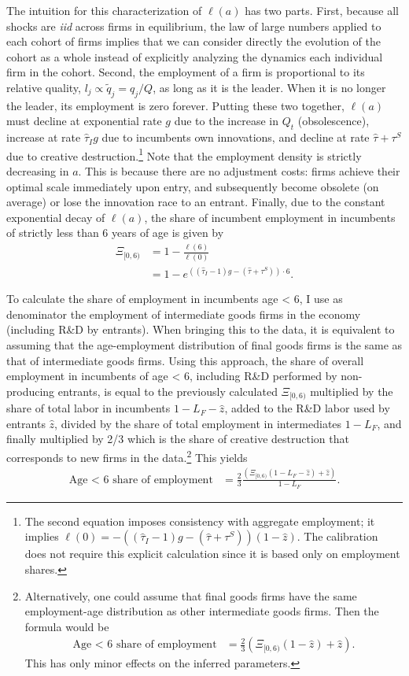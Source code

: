 \documentclass[ecta,nameyear,draft]{econsocart}
\theoremstyle{plain}
\theoremstyle{remark}
\begin{document}
\begin{appendix}
The intuition for this characterization of $\ell(a)$ has two parts. First, because all shocks are \textit{iid} across firms in equilibrium, the law of large numbers applied to each cohort of firms implies that we can consider directly the evolution of the cohort as a whole instead of explicitly analyzing the dynamics each individual firm in the cohort.  Second, the employment of a firm is proportional to its relative quality, $l_j \propto \tilde{q}_j = q_j / Q$, as long as it is the leader. When it is no longer the leader, its employment is zero forever. Putting these two together, $\ell(a)$ must decline at exponential rate $g$ due to the increase in $Q_t$ (obsolescence), increase at rate $\hat{\tau}_I g$ due to incumbents own innovations, and decline at rate $\hat{\tau} + \tau^S$ due to creative destruction.\footnote{The second equation imposes consistency with aggregate employment; it implies $\ell(0) = -((\hat{\tau}_I -1)g - (\hat{\tau} + \tau^S))(1-\hat{z})$. The calibration does not require this explicit calculation since it is based only on employment shares.} Note that the employment density is strictly decreasing in $a$. This is because there are no adjustment costs: firms achieve their optimal scale immediately upon entry, and subsequently become obsolete (on average) or lose the innovation race to an entrant. Finally, due to the constant exponential decay of $\ell(a)$, the share of incumbent employment in incumbents of strictly less than 6 years of age is given by 
\begin{align*}
	\Xi_{[0,6)} &=  1 - \frac{\ell(6)}{\ell(0)} \\
	&= 1 - e^{((\hat{\tau}_I -1)g - (\hat{\tau} + \tau^S))\cdot 6} .
\end{align*}  


To calculate the share of employment in incumbents age < 6, I use as denominator the employment of intermediate goods firms in the economy (including R\&D by entrants). When bringing this to the data, it is equivalent to assuming that the age-employment distribution of final goods firms is the same as that of intermediate goods firms. Using this approach, the share of overall employment in incumbents of age < 6, including R\&D performed by non-producing entrants, is equal to the previously calculated $\Xi_{[0,6)}$ multiplied by the share of total labor in incumbents $1 - L_F - \hat{z}$, added to the R\&D labor used by entrants $\hat{z}$, divided by the share of total employment in intermediates $1 - L_F$, and finally multiplied by 2/3 which is the share of creative destruction that corresponds to new firms in the data.\footnote{Alternatively, one could assume that final goods firms have the same employment-age distribution as other intermediate goods firms. Then the formula would be
	\begin{align*}
		\textrm{Age < 6 share of employment} &= \frac{2}{3}(\Xi_{[0,6)} (1-\hat{z}) + \hat{z}).
	\end{align*}
	This has only minor effects on the inferred parameters.} This yields
\begin{align*}
	\textrm{Age < 6 share of employment} &= \frac{2}{3} \frac{(\Xi_{[0,6)} (1 - L_F -\hat{z}) + \hat{z})}{1-L_F}.
\end{align*}


\end{appendix}
\end{document}
